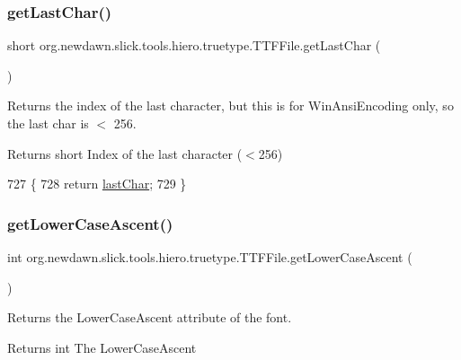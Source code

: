 \subsubsection{\texorpdfstring{get\+Last\+Char()}{getLastChar()}}
{\footnotesize\ttfamily short org.\+newdawn.\+slick.\+tools.\+hiero.\+truetype.\+T\+T\+F\+File.\+get\+Last\+Char (\begin{DoxyParamCaption}{ }\end{DoxyParamCaption})\hspace{0.3cm}{\ttfamily [inline]}}

Returns the index of the last character, but this is for Win\+Ansi\+Encoding only, so the last char is $<$ 256. \begin{DoxyReturn}{Returns}
short Index of the last character ($<$256) 
\end{DoxyReturn}

\begin{DoxyCode}
727                                \{
728         \textcolor{keywordflow}{return} \mbox{\hyperlink{classorg_1_1newdawn_1_1slick_1_1tools_1_1hiero_1_1truetype_1_1_t_t_f_file_a1346d8a5805372eb683a150c38eda75e}{lastChar}};
729     \}
\end{DoxyCode}
\mbox{\label{classorg_1_1newdawn_1_1slick_1_1tools_1_1hiero_1_1truetype_1_1_t_t_f_file_a160656c1777b7dd80f12999561349e04}} 
\subsubsection{\texorpdfstring{get\+Lower\+Case\+Ascent()}{getLowerCaseAscent()}}
{\footnotesize\ttfamily int org.\+newdawn.\+slick.\+tools.\+hiero.\+truetype.\+T\+T\+F\+File.\+get\+Lower\+Case\+Ascent (\begin{DoxyParamCaption}{ }\end{DoxyParamCaption})\hspace{0.3cm}{\ttfamily [inline]}}

Returns the Lower\+Case\+Ascent attribute of the font. \begin{DoxyReturn}{Returns}
int The Lower\+Case\+Ascent 
\end{DoxyReturn}


